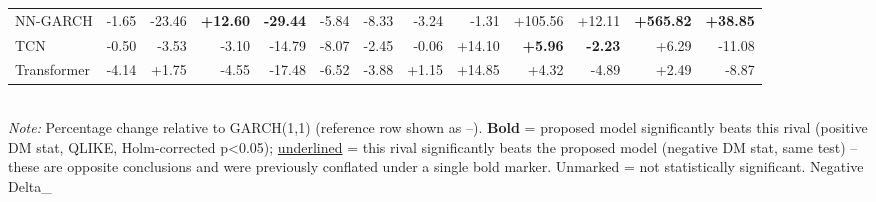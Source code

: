 \begin{table}[ht]
\begin{tabular}{lrrrrrrrrrrrr}
NN-GARCH & -1.65 & -23.46 & \textbf{+12.60} & \textbf{-29.44} & -5.84 & -8.33 & -3.24 & -1.31 & +105.56 & +12.11 & \textbf{+565.82} & \textbf{+38.85} \\
TCN & -0.50 & -3.53 & -3.10 & -14.79 & -8.07 & -2.45 & -0.06 & +14.10 & \textbf{+5.96} & \textbf{-2.23} & +6.29 & -11.08 \\
Transformer & -4.14 & +1.75 & -4.55 & -17.48 & -6.52 & -3.88 & +1.15 & +14.85 & +4.32 & -4.89 & +2.49 & -8.87 \\
\bottomrule
\end{tabular}
\\[3pt]\footnotesize\textit{Note:} Percentage change relative to GARCH(1,1) (reference row shown as --). \textbf{Bold} = proposed model significantly beats this rival (positive DM stat, QLIKE, Holm-corrected p<0.05); \underline{underlined} = this rival significantly beats the proposed model (negative DM stat, same test) -- these are opposite conclusions and were previously conflated under a single bold marker. Unmarked = not statistically significant. Negative Delta_%
\end{table}